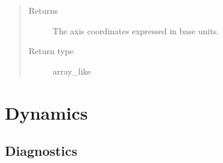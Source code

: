 \documentclass[letterpaper,10pt,english]{sphinxmanual}
\begin{document}
\begin{fulllineitems}
\begin{fulllineitems}
\begin{quote}
\begin{description}
\begin{itemize}
\end{itemize}

\item[{Returns}] \leavevmode
The axis coordinates expressed in base units.

\item[{Return type}] \leavevmode
array\_like

\end{description}\end{quote}

\end{fulllineitems}


\end{fulllineitems}



\section{Dynamics}
\label{\detokenize{api:dynamics}}

\subsection{Diagnostics}
\label{\detokenize{api:diagnostics}}
\end{document}
